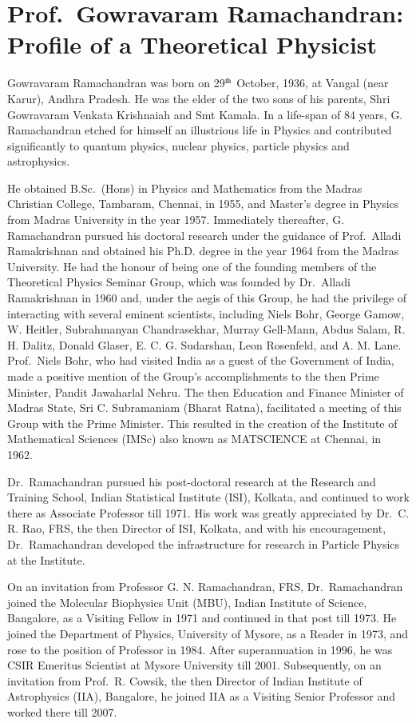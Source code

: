 \chapter[Profile of a Theoretical Physicist]{Prof.\ Gowravaram Ramachandran: Profile of a Theoretical Physicist}\label{chap37}

Gowravaram Ramachandran was born on 29$^{\rm th}$ October, 1936, at Vangal (near Karur), Andhra Pradesh. He was the elder of the two sons of his parents, Shri Gowravaram Venkata Krishnaiah and Smt Kamala. In a life-span of 84 years, G. Ramachandran etched for himself an illustrious life in Physics and contributed significantly to quantum physics, nuclear physics, particle physics and astrophysics.
 
He obtained B.Sc.\ (Hons) in Physics and Mathematics from the Madras Christian College, Tambaram, Chennai, in 1955, and Master's degree in Physics from Madras University in the year 1957. Immediately thereafter, G. Ramachandran pursued his doctoral research under the guidance of Prof.\ Alladi Ramakrishnan and obtained his Ph.D. degree in the year 1964 from the Madras University. He had the honour of being one of the founding members of the Theoretical Physics Seminar Group, which was founded by Dr.\ Alladi Ramakrishnan in 1960 and, under the aegis of this Group, he had the privilege of interacting with several eminent scientists, including Niels Bohr, George Gamow, W. Heitler,  Subrahmanyan Chandrasekhar, Murray Gell-Mann, Abdus Salam, R. H. Dalitz, Donald Glaser, E. C. G. Sudarshan, Leon Rosenfeld, and A. M. Lane. Prof.\ Niels Bohr, who had visited India as a guest of the Government of India, made a positive mention of the Group's accomplishments to the then Prime Minister, Pandit Jawaharlal Nehru. The then Education and Finance Minister of Madras State, Sri C. Subramaniam (Bharat Ratna), facilitated a meeting of this Group with the Prime Minister. This resulted in the creation of the Institute of Mathematical Sciences (IMSc) also known as MATSCIENCE at Chennai, in 1962.
 
Dr.\ Ramachandran pursued his post-doctoral research at the Research and Training School, Indian Statistical Institute (ISI), Kolkata, and continued to work there as Associate Professor till 1971. His work was greatly appreciated by Dr.\ C. R. Rao, FRS, the then Director of ISI, Kolkata, and with his encouragement, Dr.\ Ramachandran developed the infrastructure for research in Particle Physics at the Institute.
 
On an invitation from Professor G. N. Ramachandran, FRS, Dr.\ Ramachandran joined the Molecular Biophysics Unit (MBU), Indian Institute of Science, Bangalore, as a Visiting Fellow in 1971 and continued in that post till 1973. He joined the Department of Physics, University of Mysore, as a Reader in 1973, and rose to the position of Professor in 1984. After superannuation in 1996, he was CSIR Emeritus Scientist at Mysore University till 2001. Subsequently, on an invitation from Prof.\ R. Cowsik, the then Director of Indian Institute of Astrophysics (IIA), Bangalore, he joined IIA as a Visiting Senior Professor and worked there till 2007.
 
